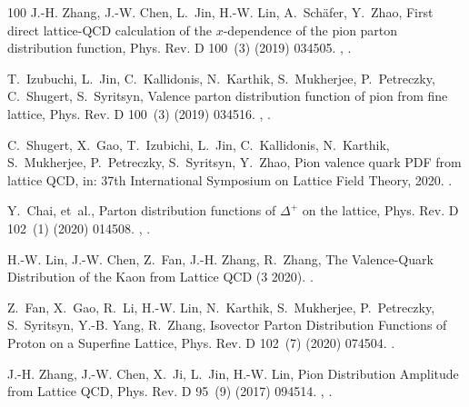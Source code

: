 \begin{thebibliography}{100}
J.-H. Zhang, J.-W. Chen, L.~Jin, H.-W. Lin, A.~Sch\"afer, Y.~Zhao, {First
  direct lattice-QCD calculation of the $x$-dependence of the pion parton
  distribution function}, Phys. Rev. D 100~(3) (2019) 034505.
\newblock \href {http://arxiv.org/abs/1804.01483} {},
  \href {https://doi.org/10.1103/PhysRevD.100.034505}
  {}.

T.~Izubuchi, L.~Jin, C.~Kallidonis, N.~Karthik, S.~Mukherjee, P.~Petreczky,
  C.~Shugert, S.~Syritsyn, {Valence parton distribution function of pion from
  fine lattice}, Phys. Rev. D 100~(3) (2019) 034516.
\newblock \href {http://arxiv.org/abs/1905.06349} {},
  \href {https://doi.org/10.1103/PhysRevD.100.034516}
  {}.

C.~Shugert, X.~Gao, T.~Izubichi, L.~Jin, C.~Kallidonis, N.~Karthik,
  S.~Mukherjee, P.~Petreczky, S.~Syritsyn, Y.~Zhao, {Pion valence quark PDF
  from lattice QCD}, in: {37th International Symposium on Lattice Field
  Theory}, 2020.
\newblock \href {http://arxiv.org/abs/2001.11650} {}.

Y.~Chai, et~al., {Parton distribution functions of $\Delta^+$ on the lattice},
  Phys. Rev. D 102~(1) (2020) 014508.
\newblock \href {http://arxiv.org/abs/2002.12044} {},
  \href {https://doi.org/10.1103/PhysRevD.102.014508}
  {}.

H.-W. Lin, J.-W. Chen, Z.~Fan, J.-H. Zhang, R.~Zhang, {The Valence-Quark
  Distribution of the Kaon from Lattice QCD} (3 2020).
\newblock \href {http://arxiv.org/abs/2003.14128} {}.

Z.~Fan, X.~Gao, R.~Li, H.-W. Lin, N.~Karthik, S.~Mukherjee, P.~Petreczky,
  S.~Syritsyn, Y.-B. Yang, R.~Zhang, {Isovector Parton Distribution Functions
  of Proton on a Superfine Lattice}, Phys. Rev. D 102~(7) (2020) 074504.
\newblock \href {http://arxiv.org/abs/2005.12015} {}.

J.-H. Zhang, J.-W. Chen, X.~Ji, L.~Jin, H.-W. Lin, {Pion Distribution Amplitude
  from Lattice QCD}, Phys. Rev. D 95~(9) (2017) 094514.
\newblock \href {http://arxiv.org/abs/1702.00008} {},
  \href {https://doi.org/10.1103/PhysRevD.95.094514}
  {}.


\end{thebibliography}
